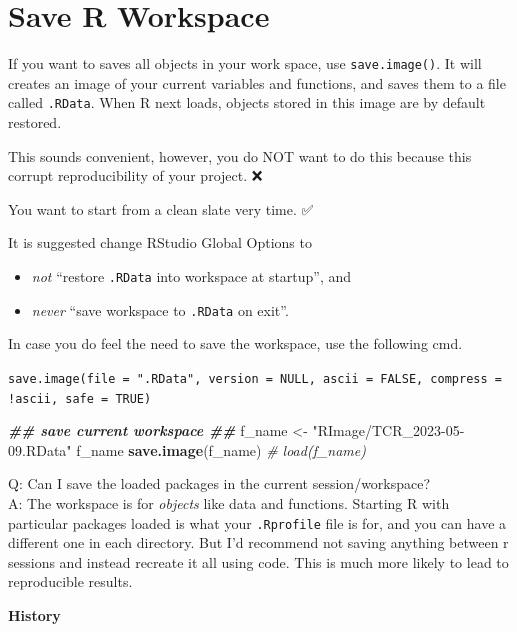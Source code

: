 \documentclass[
]{book}
\newenvironment{Shaded}{\begin{snugshade}}{\end{snugshade}}
\newcommand{\CommentTok}[1]{\textcolor[rgb]{0.56,0.35,0.01}{\textit{#1}}}
\newcommand{\DocumentationTok}[1]{\textcolor[rgb]{0.56,0.35,0.01}{\textbf{\textit{#1}}}}
\newcommand{\FunctionTok}[1]{\textcolor[rgb]{0.13,0.29,0.53}{\textbf{#1}}}
\newcommand{\NormalTok}[1]{#1}
\newcommand{\OtherTok}[1]{\textcolor[rgb]{0.56,0.35,0.01}{#1}}
\newcommand{\StringTok}[1]{\textcolor[rgb]{0.31,0.60,0.02}{#1}}
\providecommand{\tightlist}{%
  \setlength{\itemsep}{0pt}\setlength{\parskip}{0pt}}
\begin{document}
\section{Save R Workspace}\label{save-r-workspace}

If you want to saves {all objects} in your work space, use \texttt{save.image()}. It will creates an image of your current variables and functions, and saves them to a file called \texttt{.RData}. When R next loads, objects stored in this image are by default restored.

This sounds convenient, however, you do NOT want to do this because this corrupt {reproducibility} of your project. ❌

You want to {start from a clean slate} very time. ✅

It is suggested change RStudio Global Options to

\begin{itemize}
\tightlist
\item
  \emph{not} ``restore \texttt{.RData} into workspace at startup'', and
\item
  \emph{never} ``save workspace to \texttt{.RData} on exit''.
\end{itemize}

In case you do feel the need to save the workspace, use the following cmd.

\texttt{save.image(file\ =\ ".RData",\ version\ =\ NULL,\ ascii\ =\ FALSE,\ compress\ =\ !ascii,\ safe\ =\ TRUE)}

\begin{Shaded}
\begin{Highlighting}[]
\DocumentationTok{\#\# save current workspace \#\#}
\NormalTok{f\_name }\OtherTok{\textless{}{-}} \StringTok{"RImage/TCR\_2023{-}05{-}09.RData"}
\NormalTok{f\_name}
\FunctionTok{save.image}\NormalTok{(f\_name)}
\CommentTok{\# load(f\_name)}
\end{Highlighting}
\end{Shaded}

Q: Can I save the loaded packages in the current session/workspace?\\
A: The workspace is for \emph{objects} like data and functions. Starting R with particular packages loaded is what your \texttt{.Rprofile} file is for, and you can have a different one in each directory. But I'd recommend not saving anything between r sessions and instead recreate it all using code. This is much more likely to lead to reproducible results.

\textbf{History}
\end{document}
